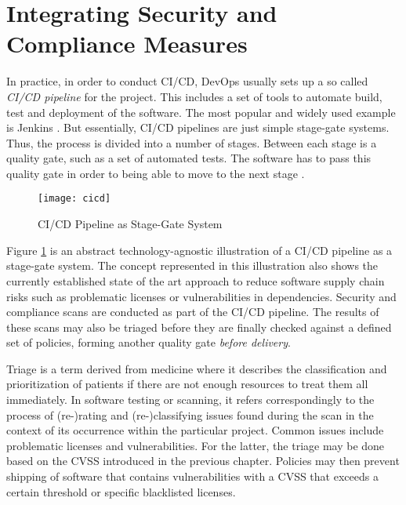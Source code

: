 \section{Integrating Security and Compliance Measures} \label{sec:Integrating Security and Compliance Measures}
In practice, in order to conduct CI/CD, DevOps usually sets up a so called \emph{CI/CD pipeline} for the project. This includes a set of tools to automate build, test and deployment of the software. The most popular and widely used example is Jenkins \cite{jenkins}. But essentially, CI/CD pipelines are just simple stage-gate systems. Thus, the process is divided into a number of stages. Between each stage is a quality gate, such as a set of automated tests. The software has to pass this quality gate in order to being able to move to the next stage \cite{StageGate}.

\begin{figure}[H]
	\centering
	\texttt{[image: cicd]}
	\caption[CI/CD Pipeline as Stage-Gate System]{CI/CD Pipeline as Stage-Gate System }
	\label{fig:CI/CD Pipeline}
\end{figure}

Figure \ref{fig:CI/CD Pipeline} is an abstract technology-agnostic illustration of a CI/CD pipeline as a stage-gate system. The concept represented in this illustration also shows the currently established state of the art approach to reduce software supply chain risks such as problematic licenses or vulnerabilities in dependencies. Security and compliance scans are conducted as part of the CI/CD pipeline. The results of these scans may also be triaged before they are finally checked against a defined set of policies, forming another quality gate \emph{before delivery}.\par 
Triage is a term derived from medicine where it describes the classification and prioritization of patients if there are not enough resources to treat them all immediately. In software testing or scanning, it refers correspondingly to the process of (re-)rating and (re-)classifying issues found during the scan in the context of its occurrence within the particular project. Common issues include problematic licenses and vulnerabilities. For the latter, the triage may be done based on the CVSS introduced in the previous chapter. Policies may then prevent shipping of software that contains vulnerabilities with a CVSS that exceeds a certain threshold or specific blacklisted licenses.\\

